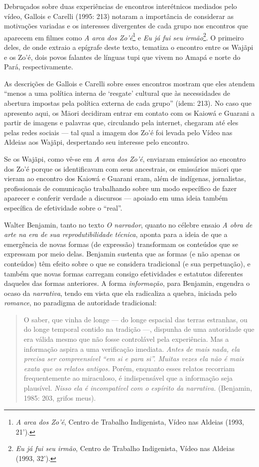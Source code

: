 Debruçados sobre duas experiências de encontros interétnicos mediados
pelo vídeo, Gallois e Carelli (1995: 213) notaram a importância de
considerar as motivações variadas e os interesses divergentes de cada
grupo nos encontros que aparecem em filmes como \emph{A arca dos
Zo'é}\footnote{\emph{A arca dos Zo'é}, Centro de Trabalho Indigenista,
  Vídeo nas Aldeias (1993, 21').} e \emph{Eu já fui seu irmão}\footnote{\emph{Eu
  já fui seu irmão}, Centro de Trabalho Indigenista, Vídeo nas Aldeias
  (1993, 32').}. O primeiro deles, de onde extraio a epígrafe deste
texto, tematiza o encontro entre os Wajãpi e os Zo'é, dois povos
falantes de línguas tupi que vivem no Amapá e norte do Pará,
respectivamente.

As descrições de Gallois e Carelli sobre esses encontros mostram que
eles atendem ``menos a uma política interna de `resgate' cultural que às
necessidades de abertura impostas pela política externa de cada grupo''
(idem: 213). No caso que apresento aqui, os Māori decidiram entrar em
contato com os Kaiowá e Guarani a partir de imagens e palavras que,
circulando pela internet, chegaram até eles pelas redes sociais --- tal
qual a imagem dos Zo'é foi levada pelo Vídeo nas Aldeias aos Wajãpi,
despertando seu interesse pelo encontro.

Se os Wajãpi, como vê-se em \emph{A arca dos Zo'é}, enviaram emissários
ao encontro dos Zo'é porque os identificavam com seus ancestrais, os
emissários māori que vieram ao encontro dos Kaiowá e Guarani eram, além
de indígenas, jornalistas, profissionais de comunicação trabalhando
sobre um modo específico de fazer aparecer e conferir verdade a
discursos --- apoiado em uma ideia também específica de efetividade
sobre o ``real''.

Walter Benjamin, tanto no texto \emph{O narrador}, quanto no célebre
ensaio \emph{A obra de arte na era de sua reprodutibilidade técnica},
aponta para a ideia de que a emergência de novas formas (de expressão)
transformam os conteúdos que se expressam por meio delas. Benjamin
sustenta que as formas (e não apenas os conteúdos) têm efeito sobre o
que se considera tradicional (e sua perpetuação), e também que novas
formas carregam consigo efetividades e estatutos diferentes daqueles das
formas anteriores. A forma \emph{informação}, para Benjamin, engendra o
ocaso da \emph{narrativa}, tendo em vista que ela radicaliza a quebra,
iniciada pelo \emph{romance}, no paradigma de autoridade tradicional:

\begin{quote}
O saber, que vinha de longe --- do longe espacial das terras estranhas,
ou do longe temporal contido na tradição ---, dispunha de uma autoridade
que era válida mesmo que não fosse controlável pela experiência. Mas a
informação aspira a uma verificação imediata. \emph{Antes de mais nada,
ela precisa ser compreensível ``em si e para si''. Muitas vezes ela não
é mais exata que os relatos antigos.} Porém, enquanto esses relatos
recorriam frequentemente ao miraculoso, é indispensável que a informação
seja plausível. \emph{Nisso ela é incompatível com o espírito da
narrativa.} (Benjamin, 1985: 203, grifos meus).
\end{quote}

